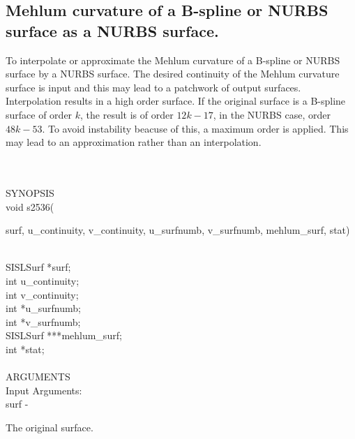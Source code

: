 \subsection{Mehlum curvature of a B-spline or NURBS 
            surface as a NURBS surface.}
\begin{minipg1}
To interpolate or approximate the Mehlum curvature of a B-spline or NURBS 
            surface by a NURBS surface. 
            The desired continuity of the Mehlum curvature surface is
            input and this may lead to a patchwork of output surfaces. 
            Interpolation results in a high order surface.
            If the original surface is a B-spline surface of order $k$,
            the result is of order $12k-17$, in the NURBS case,
            order $48k-53$.
            To avoid instability beacuse of this, a maximum order is
            applied. This may lead to an approximation rather than
            an interpolation.
\end{minipg1} \\ \\
SYNOPSIS\\
        \> void s2536(\begin{minipg3}
            {\fov surf}, {\fov u\_continuity}, {\fov v\_continuity}, {\fov u\_surfnumb}, 
	    {\fov v\_surfnumb}, {\fov mehlum\_surf}, {\fov stat})
                \end{minipg3}\\
                \>\>    SISLSurf \> *{\fov surf};\\
                \>\>    int    \>  {\fov u\_continuity};\\
                \>\>    int    \>  {\fov v\_continuity};\\
                \>\>    int    \>  *{\fov u\_surfnumb};\\
                \>\>    int    \>  *{\fov v\_surfnumb};\\
                \>\>    SISLSurf \> ***{\fov mehlum\_surf};\\
                \>\>    int    \>  *{\fov stat};\\
\\
ARGUMENTS\\
	\>Input Arguments:\\
        \>\>    {\fov surf}\> - \>  \begin{minipg2}
                     The original surface.
                               \end{minipg2}\\[0.8ex]
